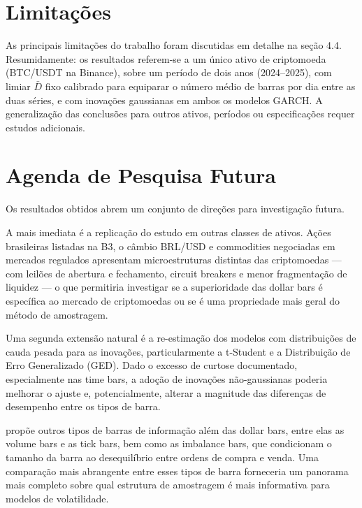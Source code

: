 \section{Limitações}
\label{sec:limitacoes_conclusao}

As principais limitações do trabalho foram discutidas em detalhe na seção 4.4.
Resumidamente: os resultados referem-se a um único ativo de criptomoeda (BTC/USDT na
Binance), sobre um período de dois anos (2024–2025), com limiar $\bar{D}$ fixo calibrado
para equiparar o número médio de barras por dia entre as duas séries, e com inovações
gaussianas em ambos os modelos GARCH. A generalização das conclusões para outros ativos,
períodos ou especificações requer estudos adicionais.

\section{Agenda de Pesquisa Futura}
\label{sec:agenda_futura}

Os resultados obtidos abrem um conjunto de direções para investigação futura.

A mais imediata é a replicação do estudo em outras classes de ativos. Ações brasileiras
listadas na B3, o câmbio BRL/USD e commodities negociadas em mercados regulados apresentam
microestruturas distintas das criptomoedas — com leilões de abertura e fechamento,
circuit breakers e menor fragmentação de liquidez — o que permitiria investigar se a
superioridade das dollar bars é específica ao mercado de criptomoedas ou se é uma
propriedade mais geral do método de amostragem.

Uma segunda extensão natural é a re-estimação dos modelos com distribuições de cauda pesada
para as inovações, particularmente a t-Student e a Distribuição de Erro Generalizado (GED).
Dado o excesso de curtose documentado, especialmente nas time bars, a adoção de inovações
não-gaussianas poderia melhorar o ajuste e, potencialmente, alterar a magnitude das
diferenças de desempenho entre os tipos de barra.

\citet{Prado2018} propõe outros tipos de barras de informação além das dollar bars,
entre elas as volume bars e as tick bars, bem como as imbalance bars, que condicionam o
tamanho da barra ao desequilíbrio entre ordens de compra e venda. Uma comparação mais
abrangente entre esses tipos de barra forneceria um panorama mais completo sobre qual
estrutura de amostragem é mais informativa para modelos de volatilidade.

